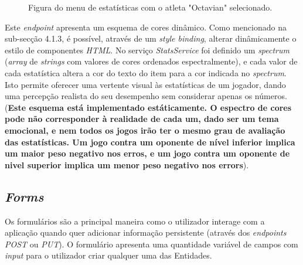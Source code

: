 \begin{figure}[h]
	\begin{center}
	\end{center}
	\caption{Figura do menu de estatísticas com o atleta "Octavian" selecionado.}\label{fig:gamestatslist}
\end{figure}

Este \textit{endpoint} apresenta um esquema de cores dinâmico. Como mencionado na sub-secção 4.1.3, é possível, através de um \textit{style binding}, alterar dinâmicamente o estilo de componentes \textit{HTML}. No serviço \textit{StatsService} foi definido um \textit{spectrum} (\textit{array} de \textit{strings} com valores de cores ordenados espectralmente), e cada valor de cada estatística altera a cor do texto do item para a cor indicada no \textit{spectrum}. Isto permite oferecer uma vertente visual às estatísticas de um jogador, dando uma percepção realista do seu desempenho sem considerar apenas os números. (\textbf{Este esquema está implementado estáticamente. O espectro de cores pode não corresponder à realidade de cada um, dado ser um tema emocional, e nem todos os jogos irão ter o mesmo grau de avaliação das estatísticas. Um jogo contra um oponente de nível inferior implica um maior peso negativo nos erros, e um jogo contra um oponente de nivel superior implica um menor peso negativo nos errors}).

\subsection{\textit{Forms}}\label{subsec428}
Os formulários são a principal maneira como o utilizador interage com a aplicação quando quer adicionar informação persistente (através dos \textit{endpoints} \textit{POST} ou \textit{PUT}). O formulário apresenta uma quantidade variável de campos com \textit{input} para o utilizador criar qualquer uma das Entidades. 

